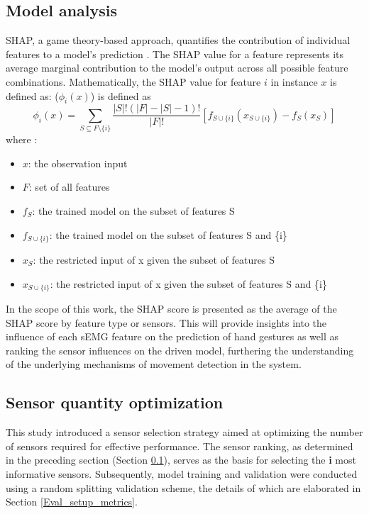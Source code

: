 \documentclass[preprint,12pt]{elsarticle}
\begin{document}
\subsection{Model analysis} \label{SHAP_sec}
SHAP, a game theory-based approach, quantifies the contribution of individual features to a model's prediction \cite{SHAP,TreeExplainer}. The SHAP value for a feature represents its average marginal contribution to the model's output across all possible feature combinations. Mathematically, the SHAP value for feature $i$ in instance $x$ is defined as:
($\phi_i(x)$) is defined as \begin{equation}
  \phi _i (x) = \sum _{S \subseteq F \setminus \{i\}} \frac{|S|!(|F|-|S|-1)!}{|F|!}[f_{S \cup \{i\}}(x_{S \cup \{i\}})-f_{S }(x_{S })]
\end{equation}  
 where :
 \begin{itemize}
   \item[] $x$: the observation input
   \item[] $F$: set of all features
   \item[] $f_S$: the trained model on the subset of features S
   
   \item[] $f_{S \cup \{i\}}$: the trained model on the subset of features 
S and \{i\}
  \item[] $x_S$: the restricted input of x given the subset of features S
  \item[] $x_{S \cup \{i\}}$: the restricted input of x given the subset of features 
S and \{i\}
 \end{itemize}


In the scope of this work, the SHAP score is presented as the average of the SHAP score by feature type or sensors. This will provide insights into the influence of each sEMG feature on the prediction of hand gestures as well as ranking the sensor influences on the driven model, furthering the understanding of the underlying mechanisms of movement detection in the system.

\subsection{Sensor quantity optimization}


This study introduced a sensor selection strategy aimed at optimizing the number of sensors required for effective performance. The sensor ranking, as determined in the preceding section (Section \ref{SHAP_sec}), serves as the basis for selecting the \textbf{i} most informative sensors. Subsequently, model training and validation were conducted using a random splitting validation scheme, the details of which are elaborated in Section \ref{Eval_setup_metrics}.
\end{document}
